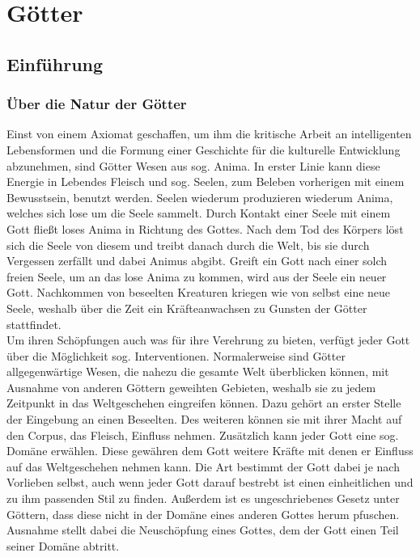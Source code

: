 \documentclass[a4paper,12pt,oneside]{book}
\begin{document}
\part{Götter}
\setcounter{chapter}{0}
\chapter{Einführung}

\section{Über die Natur der Götter}
Einst von einem Axiomat geschaffen, um ihm die kritische Arbeit an intelligenten Lebensformen und die Formung einer Geschichte für die kulturelle Entwicklung abzunehmen, sind Götter Wesen aus sog. Anima. In erster Linie kann diese Energie in Lebendes Fleisch und sog. Seelen, zum Beleben vorherigen mit einem Bewusstsein, benutzt werden. Seelen wiederum produzieren wiederum Anima, welches sich lose um die Seele sammelt. Durch Kontakt einer Seele mit einem Gott fließt loses Anima in Richtung des Gottes. Nach dem Tod des Körpers löst sich die Seele von diesem und treibt danach durch die Welt, bis sie durch Vergessen zerfällt und dabei Animus abgibt. Greift ein Gott nach einer solch freien Seele, um an das lose Anima zu kommen, wird aus der Seele ein neuer Gott. Nachkommen von beseelten Kreaturen kriegen wie von selbst eine neue Seele, weshalb über die Zeit ein Kräfteanwachsen zu Gunsten der Götter stattfindet.
\\Um ihren Schöpfungen auch was für ihre Verehrung zu bieten, verfügt jeder Gott über die Möglichkeit sog. Interventionen. Normalerweise sind Götter allgegenwärtige Wesen, die nahezu die gesamte Welt überblicken können, mit Ausnahme von anderen Göttern geweihten Gebieten, weshalb sie zu jedem Zeitpunkt in das Weltgeschehen eingreifen können. Dazu gehört an erster Stelle der Eingebung an einen Beseelten. Des weiteren können sie mit ihrer Macht auf den Corpus, das Fleisch, Einfluss nehmen. Zusätzlich kann jeder Gott eine sog. Domäne erwählen. Diese gewähren dem Gott weitere Kräfte mit denen er Einfluss auf das Weltgeschehen nehmen kann. Die Art bestimmt der Gott dabei je nach Vorlieben selbst, auch wenn jeder Gott darauf bestrebt ist einen einheitlichen und zu ihm passenden Stil zu finden. Außerdem ist es ungeschriebenes Gesetz unter Göttern, dass diese nicht in der Domäne eines anderen Gottes herum pfuschen. Ausnahme stellt dabei die Neuschöpfung eines Gottes, dem der Gott einen Teil seiner Domäne abtritt.
\end{document}
